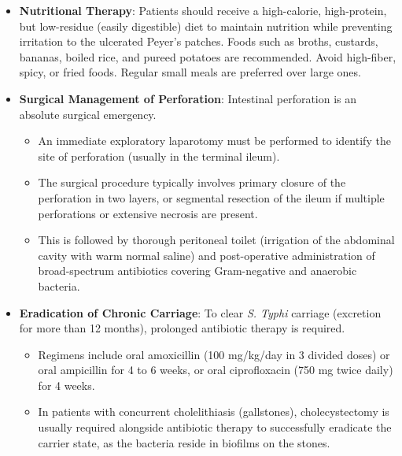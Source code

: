 \begin{itemize}
  \begin{itemize}
    \item \textbf{Oral Rehydration}: For patients with mild dehydration and no persistent vomiting, oral rehydration salts (ORS) should be administered frequently.
    \item \textbf{Intravenous Fluid Resuscitation}: For patients with severe dehydration, persistent vomiting, intestinal haemorrhage, or septic shock, intravenous fluids (such as 0.9\% normal saline or Ringer's lactate) must be administered immediately.
  \end{itemize}
  \item \textbf{Nutritional Therapy}: Patients should receive a high-calorie, high-protein, but low-residue (easily digestible) diet to maintain nutrition while preventing irritation to the ulcerated Peyer's patches. Foods such as broths, custards, bananas, boiled rice, and pureed potatoes are recommended. Avoid high-fiber, spicy, or fried foods. Regular small meals are preferred over large ones.
  \item \textbf{Surgical Management of Perforation}: Intestinal perforation is an absolute surgical emergency.
  \begin{itemize}
    \item An immediate exploratory laparotomy must be performed to identify the site of perforation (usually in the terminal ileum).
    \item The surgical procedure typically involves primary closure of the perforation in two layers, or segmental resection of the ileum if multiple perforations or extensive necrosis are present.
    \item This is followed by thorough peritoneal toilet (irrigation of the abdominal cavity with warm normal saline) and post-operative administration of broad-spectrum antibiotics covering Gram-negative and anaerobic bacteria.
  \end{itemize}
  \item \textbf{Eradication of Chronic Carriage}: To clear \textit{S. Typhi} carriage (excretion for more than 12 months), prolonged antibiotic therapy is required.
  \begin{itemize}
    \item Regimens include oral amoxicillin (100 mg/kg/day in 3 divided doses) or oral ampicillin for 4 to 6 weeks, or oral ciprofloxacin (750 mg twice daily) for 4 weeks.
    \item In patients with concurrent cholelithiasis (gallstones), cholecystectomy is usually required alongside antibiotic therapy to successfully eradicate the carrier state, as the bacteria reside in biofilms on the stones.
  \end{itemize}
\end{itemize}

